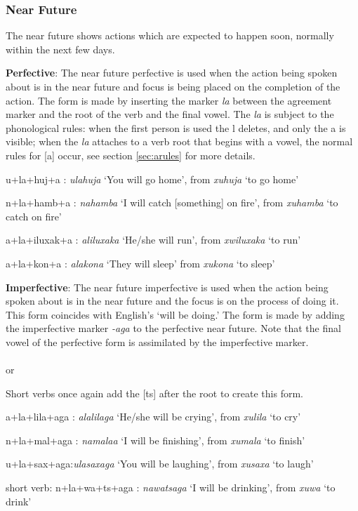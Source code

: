 \subsubsection{Near Future}
The near future shows actions which are expected to happen soon, normally within the next few days.

\textbf{Perfective}: The near future perfective is used when the action being spoken about is in the near future and focus is being placed on the completion of the action.  The form is made by inserting the marker \emph{la} between the agreement marker and the root of the verb and the final vowel.  The \emph{la} is subject to the phonological rules: when the first person is used the l deletes, and only the a is visible; when the \emph{la} attaches to a verb root that begins with a vowel, the normal rules for [a] occur, see section \ref{sec:arules} for more details.\\

\begin{wrdex}
\item u+la+huj+a : \emph{ulahuja} `You will go home', from \emph{xuhuja} `to go home'
\item n+la+hamb+a : \emph{nahamba} `I will catch [something] on fire', from \emph{xuhamba} `to catch on fire'
\item a+la+iluxak+a : \emph{aliluxaka} `He/she will run', from \emph{xwiluxaka} `to run'
\item \beta{}a+la+kon+a : \emph{\beta{}alakona} `They will sleep' from \emph{xukona} `to sleep'
\end{wrdex}

\textbf{Imperfective}: The near future imperfective is used when the action being spoken about is in the near future and the focus is on the process of doing it.  This form coincides with English's `will be doing.'  The form is made by adding the imperfective marker \emph{-a\engma{}ga} to the perfective near future.  Note that the final vowel of the perfective form is assimilated by the imperfective marker.\\
\\
or\\

Short verbs once again add the [ts] after the root to create this form.

\begin{wrdex}
\item a+la+lila+a\engma{}ga : \emph{alalila\engma{}ga} `He/she will be crying', from \emph{xulila} `to cry'
\item n+la+mal+a\engma{}ga : \emph{namala\engma{}a} `I will be finishing', from \emph{xumala} `to finish'
\item u+la+sax+a\engma{}ga:\emph{ulasaxa\engma{}ga} `You will be laughing', from \emph{xusaxa} `to laugh'
\item short verb: n+la+\engma{}wa+ts+a\engma{}ga : \emph{na\engma{}watsa\engma{}ga} `I will be drinking', from \emph{xu\engma{}wa} `to drink'
\end{wrdex}

